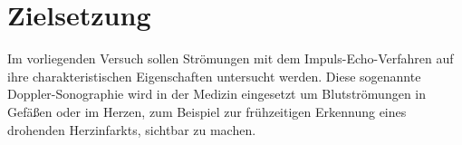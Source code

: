 \section{Zielsetzung}
\label{sec:Zielsetzung}
Im vorliegenden Versuch sollen Strömungen mit dem Impuls-Echo-Verfahren auf ihre charakteristischen Eigenschaften untersucht werden.
Diese sogenannte Doppler-Sonographie wird in der Medizin eingesetzt um Blutströmungen in Gefäßen oder im Herzen, zum Beispiel zur frühzeitigen Erkennung eines drohenden Herzinfarkts, sichtbar zu machen.
